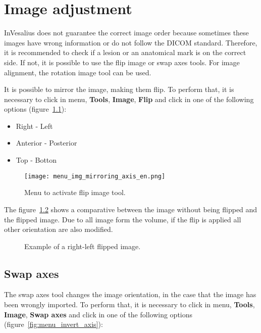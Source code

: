 \chapter{Image adjustment}

InVesalius does not guarantee the correct image order because sometimes these images have wrong information or do not follow the DICOM standard. Therefore, it is recommended to check if a lesion or an anatomical mark is on the correct side. If not, it is possible to use the flip image or swap axes tools. For image alignment, the rotation image tool can be used.

It is possible to mirror the image, making them flip. To perform that, it is necessary to click in menu, \textbf{Tools}, \textbf{Image}, \textbf{Flip} and click in one of the following options (figure~\ref{fig:menu_img_mirroring_axis_pt}):

\begin{itemize}
	\item Right - Left
	\item Anterior - Posterior
	\item Top - Botton
\end{itemize}

\begin{figure}[!htb]
\centering
\texttt{[image: menu\_img\_mirroring\_axis\_en.png]}
\caption{Menu to activate flip image tool.}
\label{fig:menu_img_mirroring_axis_pt}
\end{figure}


The figure~\ref{fig:mirrored} shows a comparative between the image without being flipped and the flipped image. Due to all image form the volume, if the flip is applied all other orientation are also modified.

\begin{figure}[!htb]
  \centering
    \qquad
  \hfill
  \caption{Example of a right-left flipped image.}
  \label{fig:mirrored}
\end{figure}

\section{Swap axes}

The swap axes tool changes the image orientation, in the case that the image has been wrongly imported. To perform that, it is necessary to click in menu, \textbf{Tools}, \textbf{Image}, \textbf{Swap axes} and click in one of the following options (figure~\ref{fig:menu_invert_axis}):

